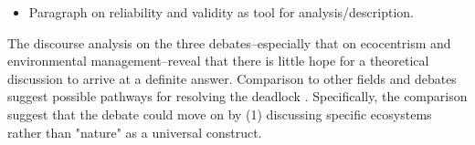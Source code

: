 \documentclass{article}
\begin{document}
	\begin{itemize}
		\item Paragraph on reliability and validity as tool for analysis/description.
	\end{itemize}

	The discourse analysis on the three debates--especially that on ecocentrism and environmental management--reveal that there is little hope for a theoretical discussion to arrive at a definite answer. Comparison to other fields and debates suggest possible pathways for resolving the deadlock \citep[cf.][]{Giddens1979a}. Specifically, the comparison suggest that the debate could move on by (1) discussing specific ecosystems rather than "nature" as a universal construct.




	\clearpage
	
	
\end{document}
